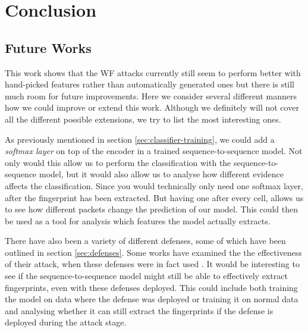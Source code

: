 \chapter{Conclusion}



\section{Future Works} \label{sec:future-works}

This work shows that the WF attacks currently still seem to perform better with hand-picked features rather than automatically generated ones but there is still much room for future improvements.
Here we consider several different manners how we could improve or extend this work.
Although we definitely will not cover all the different possible extensions, we try to list the most interesting ones.

As previously mentioned in section \ref{sec:classifier-training}, we could add a \textit{softmax layer} on top of the encoder in a trained sequence-to-sequence model.
Not only would this allow us to perform the classification with the sequence-to-sequence model, but it would also allow us to analyse how different evidence affects the classification.
Since you would technically only need one softmax layer, after the fingerprint has been extracted.
But having one after every cell, allows us to see how different packets change the prediction of our model.
This could then be used as a tool for analysis which features the model actually extracts.

There have also been a variety of different defenses, some of which have been outlined in section \ref{sec:defenses}.
Some works have examined the the effectiveness of their attack, when these defenses were in fact used \cite{kfingerprinting,wang_cai_johnson_nithyanand_goldberg_2014}.
It would be interesting to see if the sequence-to-sequence model might still be able to effectively extract fingerprints, even with these defenses deployed.
This could include both training the model on data where the defense was deployed or training it on normal data and analysing whether it can still extract the fingerprints if the defense is deployed during the attack stage.

